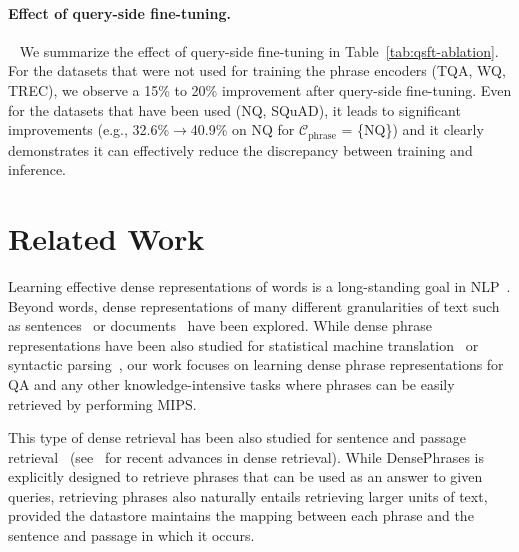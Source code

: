 \documentclass[11pt,a4paper]{article}
\newcommand{\traincorpus}{\mathcal{C}}
\begin{document}
\paragraph{Effect of query-side fine-tuning.}~\label{sec:qsft-ablation}
We summarize the effect of query-side fine-tuning in Table~\ref{tab:qsft-ablation}.
For the datasets that were not used for training the phrase encoders (TQA, WQ, TREC), we observe a 15\% to 20\% improvement after query-side fine-tuning. Even for the datasets that have been used (NQ, SQuAD), it leads to significant improvements (e.g., 32.6\%$\rightarrow$40.9\% on NQ for $\traincorpus_\text{phrase}$ = \{NQ\}) and it clearly demonstrates it can effectively reduce the discrepancy between training and inference.

 

\section{Related Work}
\label{sec:related_work}

Learning effective dense representations of words is a long-standing goal in NLP~\citep{bengio2003neural,collobert2011natural,mikolov2013distributed,peters2018deep,devlin2019bert}.
Beyond words, dense representations of many different granularities of text such as sentences~\citep{le2014distributed,kiros2015skip} or documents~\citep{yih2011learning} have been explored.
While dense phrase representations have been also studied for statistical machine translation~\citep{cho2014learning} or syntactic parsing~\citep{socher2010learning}, our work focuses on learning dense phrase representations for QA and any other knowledge-intensive tasks where phrases can be easily retrieved by performing MIPS.

This type of dense retrieval has been also studied for sentence and passage retrieval~\citep{humeau2019poly,karpukhin2020dense} (see~\citealp{lin2020pretrained} for recent advances in dense retrieval).
While DensePhrases is explicitly designed to retrieve phrases that can be used as an answer to given queries, retrieving phrases also naturally entails retrieving larger units of text, provided the datastore maintains the mapping between each phrase and the sentence and passage in which it occurs.
\end{document}
